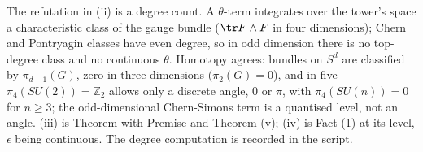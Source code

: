 The refutation in (ii) is a degree count. A $\theta$-term integrates over the tower's space a characteristic class of the gauge bundle ($\tr F \wedge F$ in four dimensions); Chern and Pontryagin classes have even degree, so in odd dimension there is no top-degree class and no continuous $\theta$. Homotopy agrees: bundles on $S^{d}$ are classified by $\pi_{d-1}(G)$, zero in three dimensions ($\pi_{2}(G) = 0$), and in five $\pi_{4}(SU(2)) = \mathbb{Z}_{2}$ allows only a discrete angle, $0$ or $\pi$, with $\pi_{4}(SU(n)) = 0$ for $n \geq 3$; the odd-dimensional Chern-Simons term is a quantised level, not an angle. (iii) is Theorem  with Premise  and Theorem (v); (iv) is Fact (1) at its level, $\epsilon$ being continuous. The degree computation is recorded in the script.
